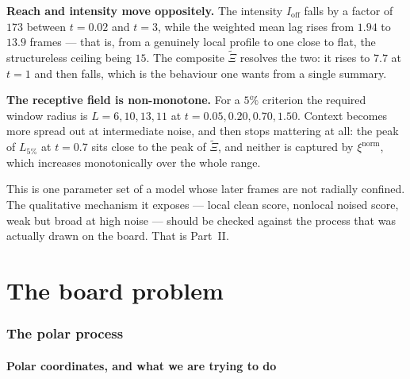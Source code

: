 \documentclass[11pt,a4paper]{article}
\begin{document}
\textbf{Reach and intensity move oppositely.} The intensity $I_{\mathrm{off}}$ falls by a
factor of $173$ between $t=0.02$ and $t=3$, while the weighted mean lag rises from $1.94$ to
$13.9$ frames --- that is, from a genuinely local profile to one close to flat, the
structureless ceiling being $15$. The composite $\widetilde\Xi$ resolves the two: it rises to
$7.7$ at $t=1$ and then falls, which is the behaviour one wants from a single summary.

\textbf{The receptive field is non-monotone.} For a $5\%$ criterion the required window radius
is $L=6,10,13,11$ at $t=0.05,0.20,0.70,1.50$. Context becomes more spread out at intermediate
noise, and then stops mattering at all: the peak of $L_{5\%}$ at $t=0.7$ sits close to the
peak of $\widetilde\Xi$, and neither is captured by $\xi^{\mathrm{norm}}$, which increases
monotonically over the whole range.

\begin{caution}
This is one parameter set of a model whose later frames are not radially confined. The
qualitative mechanism it exposes --- local clean score, nonlocal noised score, weak but broad
at high noise --- should be checked against the process that was actually drawn on the board.
That is Part~II.
\end{caution}

\FloatBarrier

\clearpage
\part{The board problem}

\section{The polar process}\label{sec:polar}

\subsection{Polar coordinates, and what we are trying to do}\label{sec:polar-coords}
\end{document}
